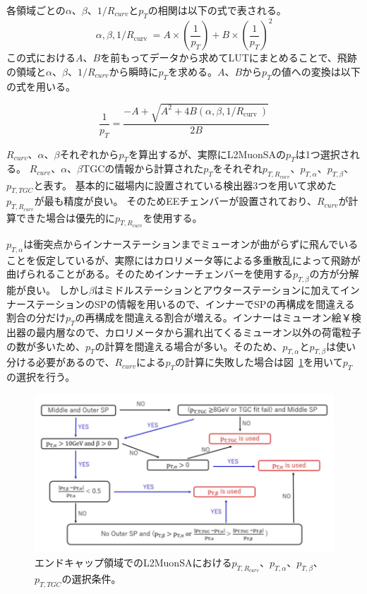 各領域ごとの$\alpha$、$\beta$、$1/R_{curv}$と$p_T$の相関は以下の式で表される。
\begin{equation}
    \alpha, \beta, 1 / R_{\text {curv }}=A \times\left(\frac{1}{p_T}\right)+B \times\left(\frac{1}{p_T}\right)^2
\end{equation}
この式における$A$、$B$を前もってデータから求めてLUTにまとめることで、飛跡の領域と$\alpha$、$\beta$、$1/R_{curv}$から瞬時に$p_T$を求める。$A$、$B$から$p_T$の値への変換は以下の式を用いる。

\begin{equation}
    \frac{1}{p_T}=\frac{-A+\sqrt{A^2+4 B\left(\alpha, \beta, 1 / R_{\text {curv }}\right)}}{2 B}
\end{equation}

$R_{curv}$、$\alpha$、$\beta$それぞれから$p_T$を算出するが、実際にL2MuonSAの$p_T$は1つ選択される。
$R_{curv}$、$\alpha$、$\beta$TGCの情報から計算された$p_T$をそれぞれ$p_{T,R_{curv}}$、$p_{T,\alpha}$、$p_{T,\beta}$、$p_{T,TGC}$と表す。
基本的に磁場内に設置されている検出器3つを用いて求めた$p_{T,R_{curv}}$が最も精度が良い。
そのためEEチェンバーが設置されており、$R_{curv}$が計算できた場合は優先的に$p_{T,R_{curv}}$を使用する。

$p_{T,\alpha}$は衝突点からインナーステーションまでミューオンが曲がらずに飛んでいることを仮定しているが、実際にはカロリメータ等による多重散乱によって飛跡が曲げられることがある。そのためインナーチェンバーを使用する$p_{T,\beta}$の方が分解能が良い。
しかし$\beta$はミドルステーションとアウターステーションに加えてインナーステーションのSPの情報を用いるので、インナーでSPの再構成を間違える割合の分だけ$p_T$の再構成を間違える割合が増える。インナーはミューオン絵￥検出器の最内層なので、カロリメータから漏れ出てくるミューオン以外の荷電粒子の数が多いため、$p_T$の計算を間違える場合が多い。そのため、$p_{T,\alpha}$と$p_{T,\beta}$は使い分ける必要があるので、$R_{curv}$による$p_T$の計算に失敗した場合は図~\ref{fig:3-11}を用いて$p_T$の選択を行う。

\begin{figure}[h]
  \centering
  \includegraphics[clip, width=14cm]{fig/3/l2muonSA_pTselection.png}
  \caption{エンドキャップ領域でのL2MuonSAにおける$p_{T,R_{curv}}$、$p_{T,\alpha}$、$p_{T,\beta}$、$p_{T,TGC}$の選択条件\cite{article:wakamiya}。}
  \label{fig:3-11}
\end{figure}


